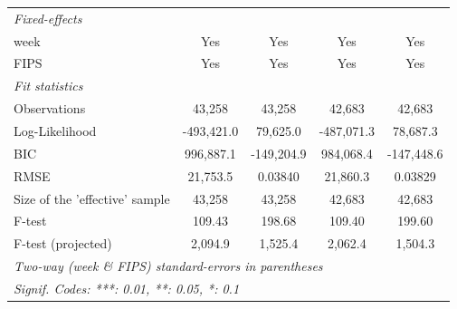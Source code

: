 \documentclass{article}
\begin{document}
\begin{landscape}
\begin{table}
\begin{tabular}{lcccc}
  \midrule \emph{Fixed-effects}&   &   &   &  \\
  week & Yes & Yes & Yes & Yes\\
  FIPS & Yes & Yes & Yes & Yes\\
  \midrule \emph{Fit statistics}&  & & & \\
  Observations & 43,258&43,258&42,683&42,683\\
  Log-Likelihood & -493,421.0&79,625.0&-487,071.3&78,687.3\\
  BIC & 996,887.1&-149,204.9&984,068.4&-147,448.6\\
  RMSE & 21,753.5&0.03840&21,860.3&0.03829\\
  Size of the 'effective' sample & 43,258&43,258&42,683&42,683\\
  F-test & 109.43&198.68&109.40&199.60\\
  F-test (projected) & 2,094.9&1,525.4&2,062.4&1,504.3\\
  \midrule\midrule\multicolumn{5}{l}{\emph{Two-way (week \& FIPS) standard-errors in parentheses}}\\
  \multicolumn{5}{l}{\emph{Signif. Codes: ***: 0.01, **: 0.05, *: 0.1}}\\
  \end{tabular}
\end{table}

\end{landscape}
\end{document}
